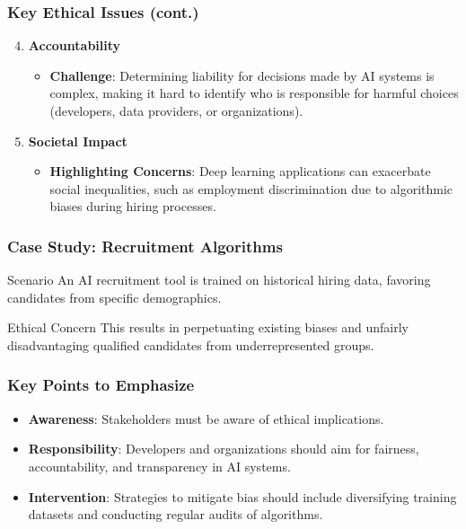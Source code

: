 \documentclass[aspectratio=169]{beamer}
\begin{document}
\begin{frame}[fragile]
    \frametitle{Key Ethical Issues (cont.)}
    \begin{enumerate}
        \setcounter{enumi}{3}
        \item \textbf{Accountability}
        \begin{itemize}
            \item \textbf{Challenge}: Determining liability for decisions made by AI systems is complex, making it hard to identify who is responsible for harmful choices (developers, data providers, or organizations).
        \end{itemize}
        
        \item \textbf{Societal Impact}
        \begin{itemize}
            \item \textbf{Highlighting Concerns}: Deep learning applications can exacerbate social inequalities, such as employment discrimination due to algorithmic biases during hiring processes.
        \end{itemize}
    \end{enumerate}
\end{frame}

\begin{frame}[fragile]
    \frametitle{Case Study: Recruitment Algorithms}
    \begin{block}{Scenario}
        An AI recruitment tool is trained on historical hiring data, favoring candidates from specific demographics.
    \end{block}
    \begin{block}{Ethical Concern}
        This results in perpetuating existing biases and unfairly disadvantaging qualified candidates from underrepresented groups.
    \end{block}
\end{frame}

\begin{frame}[fragile]
    \frametitle{Key Points to Emphasize}
    \begin{itemize}
        \item \textbf{Awareness}: Stakeholders must be aware of ethical implications.
        \item \textbf{Responsibility}: Developers and organizations should aim for fairness, accountability, and transparency in AI systems.
        \item \textbf{Intervention}: Strategies to mitigate bias should include diversifying training datasets and conducting regular audits of algorithms.
    \end{itemize}
\end{frame}
\end{document}
